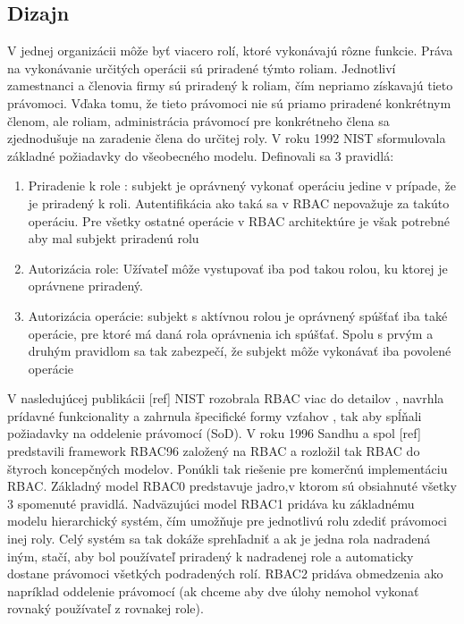 \subsection{Dizajn}
V jednej organizácii môže byť viacero rolí, ktoré vykonávajú rôzne funkcie. Práva na vykonávanie určitých operácii sú priradené týmto roliam. Jednotliví zamestnanci a členovia firmy sú priradený k roliam, čím nepriamo získavajú tieto právomoci.	Vďaka tomu, že tieto právomoci nie sú priamo priradené konkrétnym členom, ale roliam, administrácia právomocí pre konkrétneho člena sa zjednodušuje na zaradenie člena do určitej roly.
V roku 1992 NIST sformulovala základné požiadavky do všeobecného modelu.
Definovali sa 3  pravidlá:
\begin{enumerate}
		\item Priradenie k role : subjekt je oprávnený vykonať operáciu jedine v prípade, že je priradený k roli. Autentifikácia ako taká sa v RBAC nepovažuje za takúto operáciu. Pre všetky ostatné operácie v RBAC architektúre je však potrebné aby mal subjekt priradenú rolu
		\item Autorizácia role: Užívateľ môže vystupovať iba pod takou rolou, ku ktorej je oprávnene priradený.
		\item Autorizácia operácie: subjekt s aktívnou rolou je oprávnený spúšťať iba také operácie, pre ktoré má daná rola oprávnenia ich spúšťať. Spolu s prvým a druhým pravidlom sa tak zabezpečí, že subjekt môže vykonávať iba povolené operácie
\end{enumerate}

V nasledujúcej publikácii [ref] NIST rozobrala RBAC viac do detailov , navrhla prídavné funkcionality a zahrnula špecifické formy vzťahov , tak aby spĺňali požiadavky na oddelenie právomocí (SoD). V roku 1996 Sandhu a spol [ref] predstavili framework RBAC96 založený na RBAC a rozložil tak RBAC do štyroch koncepčných modelov. Ponúkli tak riešenie pre komerčnú implementáciu RBAC.
Základný model RBAC0 predstavuje jadro,v ktorom sú obsiahnuté všetky 3 spomenuté pravidlá. Nadväzujúci model RBAC1 pridáva ku základnému modelu hierarchický systém, čím umožňuje pre jednotlivú rolu zdediť právomoci inej roly. Celý systém sa tak dokáže sprehľadniť a ak je jedna rola nadradená iným, stačí, aby bol používateľ priradený k nadradenej role a automaticky dostane právomoci všetkých podradených rolí. RBAC2 pridáva obmedzenia ako napríklad oddelenie právomocí (ak chceme aby dve úlohy nemohol vykonať rovnaký používateľ z rovnakej role). 

